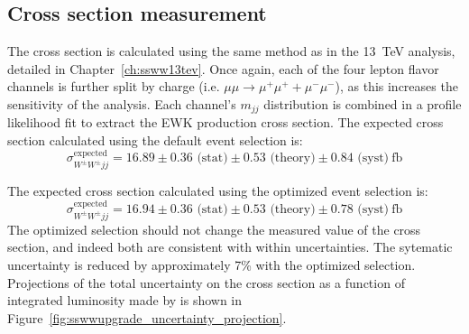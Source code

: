 \subsection{Cross section measurement}\label{sswwupgrade:results_xsec}

The cross section is calculated using the same method as in the 13~TeV analysis, detailed in Chapter~\ref{ch:ssww13tev}. 
Once again, each of the four lepton flavor channels is further split by charge (i.e. $\mu\mu\rightarrow\mu^+\mu^++\mu^-\mu^-$), as this increases the sensitivity of the analysis.
Each channel's $m_{jj}$ distribution is combined in a profile likelihood fit to extract the EWK \ssww production cross section.
The expected cross section calculated using the default event selection is:
\begin{equation}
  \sigma_{W^\pm W^\pm jj}^{\textrm{expected}} = 16.89 \pm 0.36 \textrm{\ (stat)} \pm 0.53 \textrm{\ (theory)} \pm 0.84 \textrm{\ (syst)}~\textrm{fb}
  \label{eq:sswwupgrade_xsec_default}
\end{equation}

The expected cross section calculated using the optimized event selection is:
\begin{equation}
    \sigma_{W^\pm W^\pm jj}^{\textrm{expected}} = 16.94 \pm 0.36 \textrm{\ (stat)} \pm 0.53 \textrm{\ (theory)} \pm 0.78 \textrm{\ (syst)}~\textrm{fb}
  \label{eq:sswwupgrade_xsec_optimized}
\end{equation}
The optimized selection should not change the measured value of the cross section, and indeed both are consistent with within uncertainties.
The sytematic uncertainty is reduced by approximately 7\% with the optimized selection.
Projections of the total uncertainty on the cross section as a function of integrated luminosity made by  is shown in Figure~\ref{fig:sswwupgrade_uncertainty_projection}.

